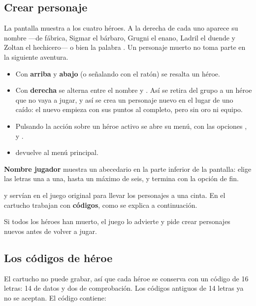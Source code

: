 \subsection{Crear personaje}


La pantalla  muestra a los cuatro héroes. A la derecha
de cada uno aparece su nombre ---de fábrica, Sigmar el bárbaro, Grugni el
enano, Ladril el duende y Zoltan el hechicero--- o bien la palabra
. Un personaje muerto no toma parte en la siguiente aventura.

\begin{itemize}
\item Con \textbf{arriba} y \textbf{abajo} (o señalando con el ratón) se
  resalta un héroe.
\item Con \textbf{derecha} se alterna entre el nombre y . Así
  se retira del grupo a un héroe que no vaya a jugar, y así se crea un
  personaje nuevo en el lugar de uno caído: el nuevo empieza con sus puntos
  al completo, pero sin oro ni equipo.
\item Pulsando la acción sobre un héroe activo se abre su menú, con las
  opciones ,  y .
\item {} devuelve al menú principal.
\end{itemize}

\textbf{Nombre jugador} muestra un abecedario en la parte inferior de la
pantalla: elige las letras una a una, hasta un máximo de seis, y termina con
la opción de fin.

 y  servían en el juego original para llevar los
personajes a una cinta. En el cartucho trabajan con \textbf{códigos}, como
se explica a continuación.

Si todos los héroes han muerto, el juego lo advierte y pide crear
personajes nuevos antes de volver a jugar.

\subsection{Los códigos de héroe}\label{sec:codigos}

El cartucho no puede grabar, así que cada héroe se conserva con un código
de 16 letras: 14 de datos y dos de comprobación. Los códigos antiguos de
14 letras ya no se aceptan. El código contiene:

